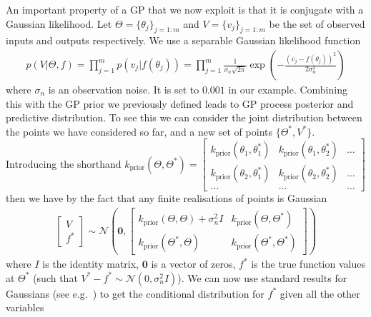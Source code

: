 An important property of a GP that we now exploit is that it is conjugate with a 
Gaussian likelihood.
Let ${\Theta} = \{\theta_j\}_{j=1:m}$ and ${V} = \{{v}_j\}_{j=1:m}$ 
be the set of observed inputs and outputs respectively.
We use a separable Gaussian likelihood function
\begin{align}
\label{eq:opt:GP-lik}
p({V}| {\Theta}, f) = \prod_{j=1}^{m}p({v}_j | f(\theta_j)) = \prod_{j=1}^{m}\frac{1}{\sigma_{n}\sqrt{2\pi}} \exp \left(-\frac{\left({v}_j-f(\theta_j)\right)^2}{2\sigma_n^2}\right)
\end{align}
where $\sigma_n$ is an observation noise. It is set to $0.001$ in our example.  Combining this with the GP prior
we previously defined leads to GP process posterior and predictive distribution.
To see this we can consider the joint distribution between the points we have
considered so far, and a new set of points $\{{\Theta}^*,{V}^*\}$.
Introducing the shorthand $k_{\text{prior}}({\Theta},{\Theta}^*) = \left[\begin{smallmatrix} k_{\text{prior}}(\theta_1,\theta_1^*) & k_{\text{prior}}(\theta_1,\theta_2^*) & \dots\\ k_{\text{prior}}(\theta_2,\theta_1^*) & k_{\text{prior}}(\theta_2,\theta_2^*) & \dots \\ \dots & \dots & \dots\end{smallmatrix}\right]$ then we have by the fact that
any finite realisations of points is Gaussian
\begin{align}
\label{eq:opt:GP-joint}
\left[\begin{matrix} 
V \\ f^*
\end{matrix}\right] \sim \mathcal{N} \left(\mathbf{0}, \left[
\begin{matrix}
k_{\text{prior}}({\Theta},{\Theta})+\sigma_n^2 I & k_{\text{prior}}({\Theta},{\Theta}^*) \\
k_{\text{prior}}({\Theta}^*,{\Theta}) & k_{\text{prior}}({\Theta}^*,{\Theta}^*)
\end{matrix}
\right]\right)
\end{align}
where $I$ is the identity matrix, $\mathbf{0}$ is a vector of zeros, $f^*$ is the true
function values at ${\Theta}^*$ (such that $V^*-f^*\sim\mathcal{N}(0,\sigma_n^2 I)$).
We can now use standard results for Gaussians (see e.g.~\cite{petersen2008matrix}) to get
the conditional distribution for $f^*$ given all the other variables
